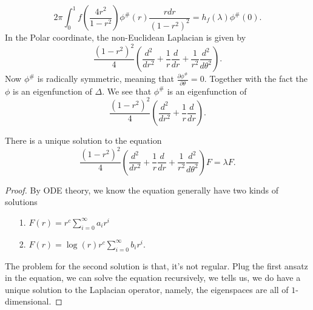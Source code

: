 \documentclass[../main.tex]{subfiles}
\begin{document}
$$2\pi \int_{0}^{1}f(\frac{4r^{2}}{1-r^{2}})\phi^{\#}(r)\frac{rdr}{(1-r^{2})^{2}}=h_{f}(\lambda)\phi^{\#}(0).$$
In the Polar coordinate, the non-Euclidean Laplacian is given by 
$$\frac{(1-r^{2})^{2}}{4}(\frac{d^{2}}{dr^{2}}+\frac{1}{r}\frac{d}{dr} +\frac{1}{r^{2}}\frac{d^{2}}{d\theta^{2}}).$$
Now $\phi^{\#}$ is radically symmetric, meaning that $\frac{\partial \phi^{\#}}{\partial\theta}=0$. Together with the fact the $\phi$ is an eigenfunction of $\Delta$. We see that $\phi^{\#}$ is an eigenfunction of 
$$\frac{(1-r^{2})^{2}}{4}(\frac{d^{2}}{dr^{2}}+\frac{1}{r}\frac{d}{dr}).$$
\begin{lemma}
There is a unique solution to the equation 
$$\frac{(1-r^{2})^{2}}{4}(\frac{d^{2}}{dr^{2}}+\frac{1}{r}\frac{d}{dr} +\frac{1}{r^{2}}\frac{d^{2}}{d\theta^{2}})F=\lambda F.$$
\end{lemma}
\begin{proof}
By ODE theory, we know the equation generally have two kinds of solutions
\begin{itemize}
    \item[1.] $F(r)=r^{c}\sum_{i=0}^{\infty}a_{i}r^{i}$ \item[2.] $F(r)= \log(r)r^{c}\sum_{i=0}^{\infty}b_{i}r^{i}$.
\end{itemize}
The problem for the second solution is that, it's not regular. Plug the first ansatz in the equation, we can solve the equation recursively, we tells us, we do have a unique solution to the Laplacian operator, namely, the eigenspaces are all of $1$-dimensional.
\end{proof}
\end{document}
